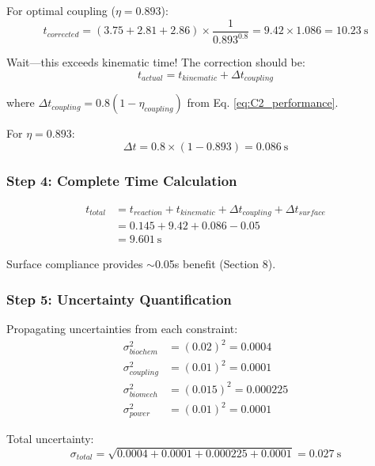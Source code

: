 \documentclass[10pt]{article}
\begin{document}
For optimal coupling ($\eta = 0.893$):
\begin{equation}
t_{corrected} = (3.75 + 2.81 + 2.86) \times \frac{1}{0.893^{0.8}} = 9.42 \times 1.086 = 10.23~\text{s}
\label{eq:corrected_time}
\end{equation}

Wait—this exceeds kinematic time! The correction should be:
\begin{equation}
t_{actual} = t_{kinematic} + \Delta t_{coupling}
\label{eq:additive_correction}
\end{equation}

where $\Delta t_{coupling} = 0.8(1-\eta_{coupling})$ from Eq. \ref{eq:C2_performance}.

For $\eta = 0.893$:
\begin{equation}
\Delta t = 0.8 \times (1 - 0.893) = 0.086~\text{s}
\end{equation}

\subsubsection{Step 4: Complete Time Calculation}

\begin{align}
t_{total} &= t_{reaction} + t_{kinematic} + \Delta t_{coupling} + \Delta t_{surface} \\
&= 0.145 + 9.42 + 0.086 - 0.05 \\
&= 9.601~\text{s}
\end{align}

Surface compliance provides $\sim$0.05s benefit (Section 8).

\subsubsection{Step 5: Uncertainty Quantification}

Propagating uncertainties from each constraint:
\begin{align}
\sigma_{biochem}^2 &= (0.02)^2 = 0.0004 \\
\sigma_{coupling}^2 &= (0.01)^2 = 0.0001 \\
\sigma_{biomech}^2 &= (0.015)^2 = 0.000225 \\
\sigma_{power}^2 &= (0.01)^2 = 0.0001
\end{align}

Total uncertainty:
\begin{equation}
\sigma_{total} = \sqrt{0.0004 + 0.0001 + 0.000225 + 0.0001} = 0.027~\text{s}
\label{eq:total_uncertainty}
\end{equation}
\end{document}
